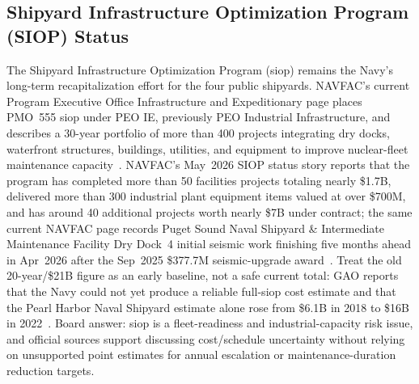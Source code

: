 \documentclass[../main.tex]{subfiles}
\begin{document}
\subsection{Shipyard Infrastructure Optimization Program (SIOP) Status}
The Shipyard Infrastructure Optimization Program (\ac{siop}) remains the Navy's long-term recapitalization effort for the four public shipyards. NAVFAC's current Program Executive Office Infrastructure and Expeditionary page places PMO~555 \ac{siop} under PEO IE, previously PEO Industrial Infrastructure, and describes a 30-year portfolio of more than 400 projects integrating dry docks, waterfront structures, buildings, utilities, and equipment to improve nuclear-fleet maintenance capacity~\autocite{navfac-siop-2026}. NAVFAC's May~2026 SIOP status story reports that the program has completed more than 50 facilities projects totaling nearly \$1.7B, delivered more than 300 industrial plant equipment items valued at over \$700M, and has around 40 additional projects worth nearly \$7B under contract; the same current NAVFAC page records Puget Sound Naval Shipyard \& Intermediate Maintenance Facility Dry Dock~4 initial seismic work finishing five months ahead in Apr~2026 after the Sep~2025 \$377.7M seismic-upgrade award~\autocite{navfac-siop-status-2026,navfac-siop-2026,navfac-dd4-2025}. Treat the old 20-year/\$21B figure as an early baseline, not a safe current total: GAO reports that the Navy could not yet produce a reliable full-\ac{siop} cost estimate and that the Pearl Harbor Naval Shipyard estimate alone rose from \$6.1B in 2018 to \$16B in 2022~\autocite{gao-siop-2023}. Board answer: \ac{siop} is a fleet-readiness and industrial-capacity risk issue, and official sources support discussing cost/schedule uncertainty without relying on unsupported point estimates for annual escalation or maintenance-duration reduction targets.
\end{document}
